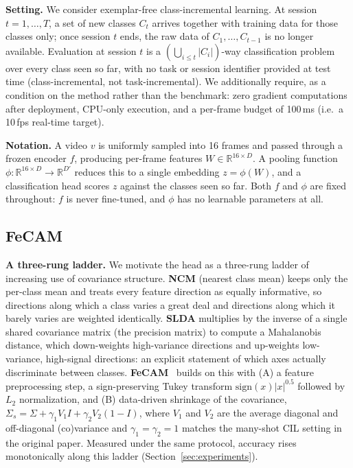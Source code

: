 \documentclass[a4paper,fleqn]{cas-dc}
\begin{document}
\textbf{Setting.} We consider exemplar-free class-incremental learning. At session
$t = 1,\ldots,T$, a set of new classes $C_t$ arrives together with training
data for those classes only; once session $t$ ends, the raw data of
$C_1,\ldots,C_{t-1}$ is no longer available. Evaluation at session $t$ is a
$\left(\bigcup_{i \le t} |C_i|\right)$-way classification problem over every
class seen so far, with no task or session identifier provided at test time
(class-incremental, not task-incremental). We additionally require, as a
condition on the method rather than the benchmark: zero gradient
computations after deployment, CPU-only execution, and a per-frame budget of
100\,ms (i.e.\ a 10\,fps real-time target).

\textbf{Notation.} A video $v$ is uniformly sampled into 16 frames and
passed through a frozen encoder $f$, producing per-frame features
$W \in \mathbb{R}^{16 \times D}$. A pooling function
$\phi : \mathbb{R}^{16 \times D} \to \mathbb{R}^{D'}$ reduces this to a
single embedding $z = \phi(W)$, and a classification head scores $z$ against
the classes seen so far. Both $f$ and $\phi$ are fixed throughout: $f$ is
never fine-tuned, and $\phi$ has no learnable parameters at all.

\subsection{FeCAM}
\label{sec:method-fecam}

\textbf{A three-rung ladder.} We motivate the head as a three-rung ladder of increasing use of covariance
structure. \textbf{NCM} (nearest class mean) keeps only the per-class mean
and treats every feature direction as equally informative, so directions
along which a class varies a great deal and directions along which it barely
varies are weighted identically. \textbf{SLDA} multiplies by the inverse of
a single shared covariance matrix (the precision matrix) to compute a
Mahalanobis distance, which down-weights high-variance directions and
up-weights low-variance, high-signal directions: an explicit statement of
which axes actually discriminate between classes.
\textbf{FeCAM}~\cite{goswami2023fecam} builds on this with (A) a feature
preprocessing step, a sign-preserving Tukey transform
$\mathrm{sign}(x)|x|^{0.5}$ followed by $L_2$ normalization, and (B)
data-driven shrinkage of the covariance,
$\Sigma_s = \Sigma + \gamma_1 V_1 I + \gamma_2 V_2 (1-I)$, where $V_1$ and
$V_2$ are the average diagonal and off-diagonal (co)variance and
$\gamma_1=\gamma_2=1$ matches the many-shot CIL setting in the original
paper. Measured under the same protocol, accuracy rises monotonically
along this ladder (Section~\ref{sec:experiments}).
\end{document}
